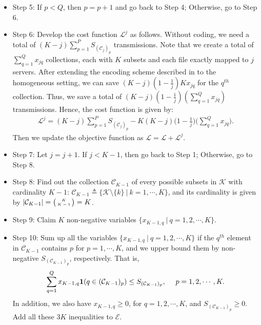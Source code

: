\documentclass[conference]{IEEEtran}
\begin{document}
\begin{itemize}
\item{Step 5:} If $p<Q$, then $p=p+1$ and go back to Step 4; Otherwise, go to Step 6.

\item{Step 6:} Develop the cost function $\mathcal{L}^j$ as follows. Without coding, we need a total of $(K-j)\sum_{p=1}^P S_{(\mathcal{C}_j)_p}$ transmissions. Note that we create a total of $\sum_{q=1}^Q x_{jq}$ collections, each with $K$ subsets and each file exactly mapped to $j$ servers. After extending  the encoding scheme described in \cite{Avestimehr_CDC} to the homogeneous setting, we can save $(K-j)(1-\frac{1}{j})Kx_{jq}$ for the $q^{th}$ collection. Thus, we save a total of $(K-j)(1-\frac{1}{j})(\sum_{q=1}^Q x_{jq})$ transmissions. Hence, the cost function is given by:
\begin{eqnarray*}
\mathcal{L}^j=(K-j)\sum_{p=1}^P S_{(\mathcal{C}_j)_p}-K(K-j)\bigg(1-\frac{1}{j}\bigg)\bigg(\sum_{q=1}^Q x_{jq}\bigg).
\end{eqnarray*}
Then we update the objective function as $\mathcal{L}=\mathcal{L}+\mathcal{L}^j$.

\item{Step 7:} Let $j=j+1$. If $j<K-1$, then go back to Step 1; Otherwise, go to Step 8.

\item{Step 8:} Find out the collection $\mathcal{C}_{K-1}$ of every possible subsets in $\mathcal{K}$ with cardinality $K-1$: $\mathcal{C}_{K-1}\triangleq \{\mathcal{K}\setminus \{k\}~|~k=1,\cdots,K\}$, and its cardinality is given by $|\mathcal{C}_{K-1}|=\big(\!\!\begin{tiny}\begin{array}{c}K\\K-1\end{array}\end{tiny}\!\!\big)=K$.

\item{Step 9:} Claim $K$ non-negative variables $\{x_{K-1,q}~|~q=1,2,\cdots,K\}$.

\item{Step 10:} Sum up all the variables $\{x_{K-1,q}~|~q=1,2,\cdots,K\}$ if the $q^{th}$ element in $\mathcal{C}_{K-1}$ contains $p$ for $p=1,\cdots,K$, and we upper bound them by non-negative $S_{(\mathcal{C}_{K-1})_p}$, respectively. That is,
\begin{eqnarray*}
\sum_{q=1}^Q x_{K-1,q}{\bf 1}(q\in (\mathcal{C}_{K-1})_p)\leq S_{(\mathcal{C}_{K-1})_p},~~~~p=1,2,\cdots,K.
\end{eqnarray*}
In addition, we also have $x_{K-1,q}\geq 0$, for $q=1,2,\cdots,K$, and $S_{(\mathcal{C}_{K-1})_p}\geq 0$. Add all these $3K$ inequalities to $\mathcal{E}$.


\end{itemize}
\end{document}
